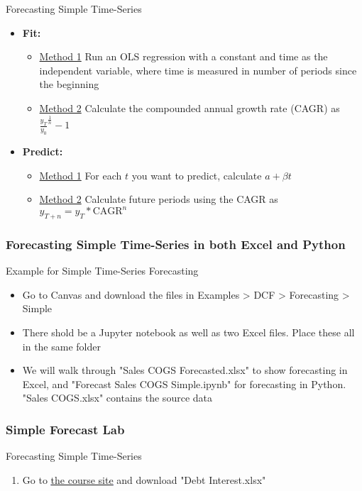 \documentclass[handout, 11pt]{beamer}
\begin{document}
\begin{section}{Forecasting Simple Time-Series}
\begin{frame}
\vfill
\begin{itemize}
\item \textbf{Fit:}
\begin{itemize}
\item \underline{Method 1}
Run an OLS regression with a constant and time as the independent variable, where time is measured in number of periods since the beginning
\item \underline{Method 2}
Calculate the compounded annual growth rate (CAGR) as
$\frac{y_T}{y_0}^{\frac{1}{n}} - 1$
\end{itemize}
\vfill
\item \textbf{Predict:}
\begin{itemize}
\item \underline{Method 1}
For each $t$ you want to predict, calculate $a + \beta t$
\item \underline{Method 2}
Calculate future periods using the CAGR as
$y_{T + n} = y_T * \text{CAGR}^n$
\end{itemize}
\end{itemize}
\end{frame}
\begin{frame}
\frametitle{Forecasting Simple Time-Series in both Excel and Python}
{
\begin{block}{Example for Simple Time-Series Forecasting}
\begin{itemize}
\item Go to Canvas and download the files in Examples > DCF > Forecasting > Simple
\item There shold be a Jupyter notebook as well as two Excel files. Place these all in the same folder
\item We will walk through "Sales COGS Forecasted.xlsx" to show forecasting in Excel, and "Forecast Sales COGS Simple.ipynb" for forecasting in Python. "Sales COGS.xlsx" contains the source data
\end{itemize}
\end{block}
}
\end{frame}
\begin{frame}
\frametitle{Simple Forecast Lab}
{
\begin{block}{Forecasting Simple Time-Series}
\begin{enumerate}
\item Go to
\textcolor{blue}{\underline{\href{https://nickderobertis.github.io/fin-model-course/}{the course site}}}
and download "Debt Interest.xlsx"

\end{enumerate}
\end{block}}
\end{frame}
\end{section}
\end{document}
